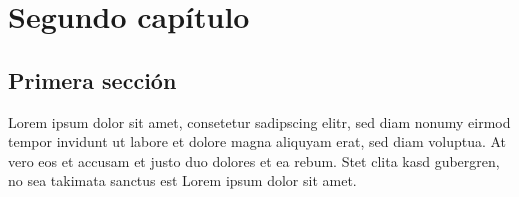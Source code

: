 
\chapter{Segundo capítulo}
\renewcommand{\dictumwidth}{0.45\textwidth} %

\section{Primera sección}
Lorem ipsum dolor sit amet, consetetur sadipscing elitr, sed diam nonumy eirmod
tempor invidunt ut labore et dolore magna aliquyam erat, sed diam voluptua. At
vero eos et accusam et justo duo dolores et ea rebum. Stet clita kasd gubergren,
no sea takimata sanctus est Lorem ipsum dolor sit amet.
\endinput
